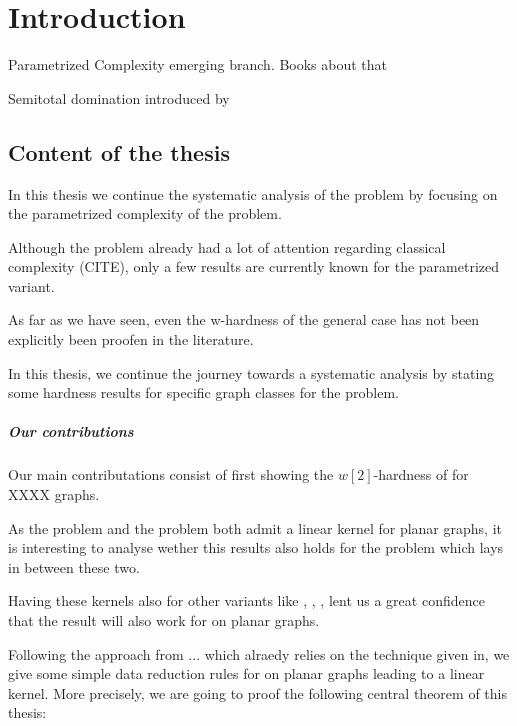 \chapter{Introduction}


Parametrized Complexity emerging branch. Books about that

Semitotal domination introduced by 
\section{Content of the thesis}

In this thesis we continue the systematic analysis of the \sdom problem by focusing on the parametrized complexity of the problem. 

Although the problem already had a lot of attention regarding classical complexity (CITE), only a few results are currently known for the parametrized variant. 

As far as we have seen, even the w-hardness of the general case has not been explicitly been proofen in the literature. 

In this thesis, we continue the journey towards a systematic analysis by stating some hardness results for specific graph classes for the problem.

\paragraph{Our contributions}

Our main contributations consist of first showing the $w[2]$-hardness of \sdom for XXXX graphs.

\noindent As the \dom problem and the \tdom problem both admit a linear kernel for planar graphs, it is interesting to analyse wether this results also holds for the \sdom problem which lays in between these two. 

Having these kernels also for other variants like \eddom, \efdom, \cdom, \rbdom lent us a great confidence that the result will also work for \sdom on planar graphs.


Following the approach from ... which alraedy relies on the technique given in, we give some simple data reduction rules for \sdom on planar graphs leading to a linear kernel. More precisely, we are going to proof the following central theorem of this thesis:

